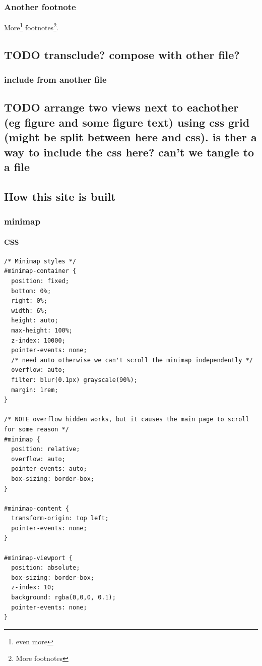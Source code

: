 \documentclass[11pt]{article}
\begin{document}
\subsubsection{Another footnote}
\label{sec:org52083ed}
More\footnote{even more} footnotes\footnote{More footnotes}.
\subsection{{\bfseries\sffamily TODO} transclude? compose with other file?}
\label{sec:org2c3f55e}
\subsubsection{include from another file}
\label{sec:orgfb2cca2}
\subsection{{\bfseries\sffamily TODO} arrange two views next to eachother (eg figure and some figure text) using css grid (might be split between here and css). is ther a way to include the css here? can't we tangle to a file}
\label{sec:orgafe14fc}

\subsection{How this site is built}
\label{sec:org1a9107f}

\subsubsection{minimap}
\label{sec:org8569aa4}
\paragraph{CSS}
\label{sec:org6e7abf1}
\begin{verbatim}
/* Minimap styles */
#minimap-container {
  position: fixed;
  bottom: 0%;
  right: 0%;
  width: 6%;
  height: auto;
  max-height: 100%;
  z-index: 10000;
  pointer-events: none;
  /* need auto otherwise we can't scroll the minimap independently */
  overflow: auto;
  filter: blur(0.1px) grayscale(90%);
  margin: 1rem;
}

/* NOTE overflow hidden works, but it causes the main page to scroll for some reason */
#minimap {
  position: relative;
  overflow: auto;
  pointer-events: auto;
  box-sizing: border-box;
}

#minimap-content {
  transform-origin: top left;
  pointer-events: none;
}

#minimap-viewport {
  position: absolute;
  box-sizing: border-box;
  z-index: 10;
  background: rgba(0,0,0, 0.1);
  pointer-events: none;
}
\end{verbatim}
\end{document}

